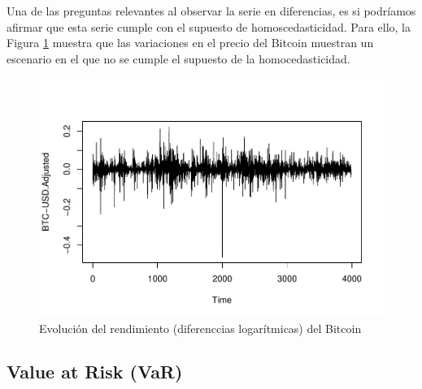 \documentclass[
]{book}
\newenvironment{Shaded}{\begin{snugshade}}{\end{snugshade}}
\newcommand{\AttributeTok}[1]{\textcolor[rgb]{0.13,0.29,0.53}{#1}}
\newcommand{\DecValTok}[1]{\textcolor[rgb]{0.00,0.00,0.81}{#1}}
\newcommand{\FunctionTok}[1]{\textcolor[rgb]{0.13,0.29,0.53}{\textbf{#1}}}
\newcommand{\NormalTok}[1]{#1}
\newcommand{\OtherTok}[1]{\textcolor[rgb]{0.56,0.35,0.01}{#1}}
\newcommand{\SpecialCharTok}[1]{\textcolor[rgb]{0.81,0.36,0.00}{\textbf{#1}}}
\newcommand{\StringTok}[1]{\textcolor[rgb]{0.31,0.60,0.02}{#1}}
\begin{document}
Una de las preguntas relevantes al observar la serie en diferencias, es si podríamos afirmar que esta serie cumple con el supuesto de homoscedasticidad. Para ello, la Figura \ref{fig:fig102} muestra que las variaciones en el precio del Bitcoin muestran un escenario en el que no se cumple el supuesto de la homocedasticidad.

\begin{Shaded}
\end{Shaded}

\begin{figure}

{\centering \includegraphics{Notas-Series-Tiempo_files/figure-latex/fig102-1} 

}

\caption{Evolución del rendimiento (diferenccias logarítmicas) del Bitcoin}\label{fig:fig102}
\end{figure}

\hypertarget{value-at-risk-var}{%
\subsection{Value at Risk (VaR)}\label{value-at-risk-var}}
\end{document}
